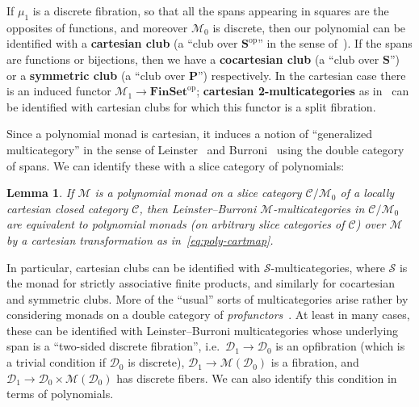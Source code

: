 \documentclass{article}
\newtheorem{lem}[thm]{Lemma}
\theoremstyle{definition}
\theoremstyle{remark}
\def\M{\mathcal{M}}
\def\D{\mathcal{D}}
\def\sC{\mathscr{C}}
\begin{document}
If $\mu_1$ is a discrete fibration, so that all the spans appearing in squares are the opposites of functions, and moreover $\M_0$ is discrete, then our polynomial can be identified with a \textbf{cartesian club} (a ``club over $\mathbf{S}^{\mathrm{op}}$'' in the sense of~\cite{kelly:mv-funct-calc,kelly:abst-coh}).
If the spans are functions or bijections, then we have a \textbf{cocartesian club} (a ``club over $\mathbf{S}$'') or a \textbf{symmetric club} (a ``club over $\mathbf{P}$'') respectively.
In the cartesian case there is an induced functor $\M_1 \to \mathbf{FinSet}^{\mathrm{op}}$; \textbf{cartesian 2-multicategories} as in~\cite{lsr:multi} can be identified with cartesian clubs for which this functor is a split fibration.

Since a polynomial monad is cartesian, it induces a notion of ``generalized multicategory'' in the sense of Leinster~\cite{leinster:higher-opds} and Burroni~\cite{burroni:t-cats} using the double category of spans.
We can identify these with a slice category of polynomials:

\begin{lem}\label{thm:poly-multi}
  If $\M$ is a polynomial monad on a slice category $\sC/\M_0$ of a locally cartesian closed category $\sC$, then Leinster--Burroni $\M$-multicategories in $\sC/\M_0$ are equivalent to polynomial monads (on arbitrary slice categories of $\sC$) over $\M$ by a cartesian transformation as in~\eqref{eq:poly-cartmap}.
\end{lem}

In particular, cartesian clubs can be identified with $\mathcal{S}$-multicategories, where $\mathcal{S}$ is the monad for strictly associative finite products, and similarly for cocartesian and symmetric clubs.
More of the ``usual'' sorts of multicategories arise rather by considering monads on a double category of \emph{profunctors}~\cite{cs:multicats}.
At least in many cases, these can be identified with Leinster--Burroni multicategories whose underlying span is a ``two-sided discrete fibration'', i.e.\ $\D_1 \to \D_0$ is an opfibration (which is a trivial condition if $\D_0$ is discrete), $\D_1 \to \M(\D_0)$ is a fibration, and $\D_1 \to \D_0 \times \M(\D_0)$ has discrete fibers.
We can also identify this condition in terms of polynomials.
\end{document}
